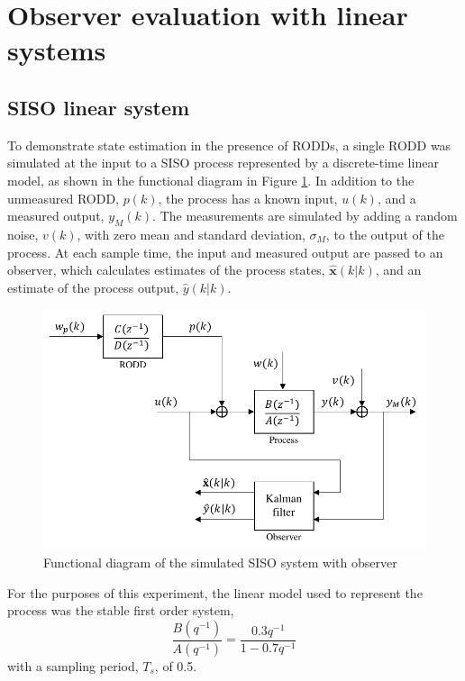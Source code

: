 \section{Observer evaluation with linear systems} \label{sec:sim-obs-lin}

\subsection{SISO linear system} \label{sec:sim-obs-lin-1}

To demonstrate state estimation in the presence of \gls{RODD}s, a single \gls{RODD} was simulated at the input to a SISO process represented by a discrete-time linear model, as shown in the functional diagram in Figure \ref{fig:sim-sys-diag-siso}. In addition to the unmeasured \gls{RODD}, $p(k)$, the process has a known input, $u(k)$, and a measured output, $y_M(k)$. The measurements are simulated by adding a random noise, $v(k)$, with zero mean and standard deviation, $\sigma_M$, to the output of the process. At each sample time, the input and measured output are passed to an observer, which calculates estimates of the process states, $\hat{\mathbf{x}}(k|k)$, and an estimate of the process output, $\hat{y}(k|k)$. %
\begin{figure}[htp]
	\centering
	\includegraphics[width=11.5cm]{images/sim-sys-diag-siso.pdf}
	\caption{Functional diagram of the simulated \gls{SISO} system with observer}
	\label{fig:sim-sys-diag-siso}
\end{figure}

For the purposes of this experiment, the linear model used to represent the process was the stable first order system,
\begin{equation}
	\frac{B(q^{-1})}{A(q^{-1})} = \frac{0.3q^{-1}}{1-0.7q^{-1}}
\end{equation}
with a sampling period, $T_s$, of 0.5.
%

